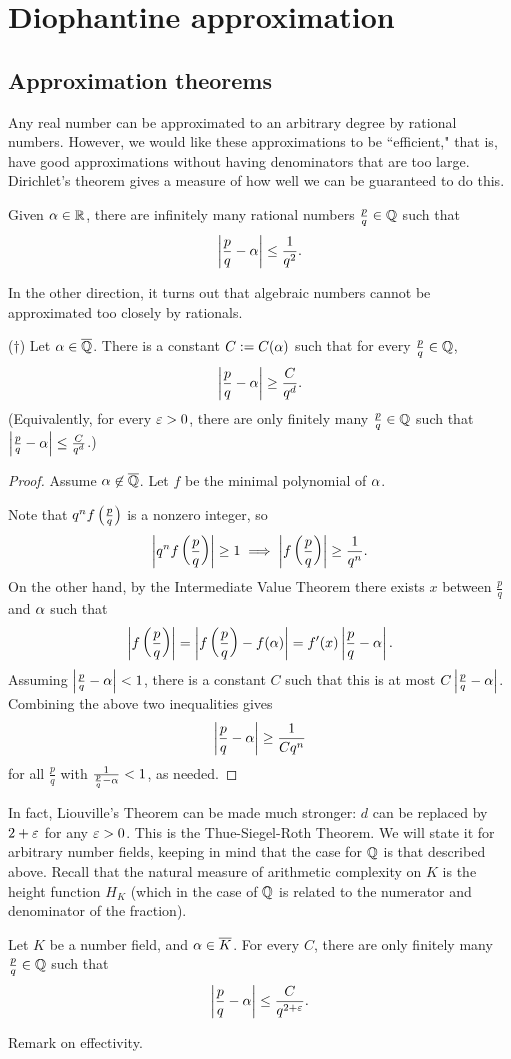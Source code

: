 \chapter{Diophantine approximation}
\section{Approximation theorems}
Any real number can be approximated to an arbitrary degree by rational numbers. However, we would like these approximations to be ``efficient," that is, have good approximations without having denominators that are too large. Dirichlet's theorem gives a measure of how well we can be guaranteed to do this.
\begin{thm}[Dirichlet]
Given $\alpha\in \mathbb{R}$, there are infinitely many rational numbers $\frac pq\in\mathbb{Q}$ such that
\[
\left| {\frac pq-\alpha} \right|\le \frac{1}{q^2}.
\]
\end{thm}
In the other direction, it turns out that algebraic numbers cannot be approximated too closely by rationals.
\begin{thm}[Liouville]($\dagger$)
Let $\alpha\in \overline{\mathbb{Q}}$. There is a constant $C:=C(\alpha)$ such that for every $\frac{p}{q}\in \mathbb{Q}$, 
\[
\left| {\frac pq-\alpha} \right|\ge \frac{C}{q^d}.
\]
(Equivalently, for every $\varepsilon>0$, there are only finitely many $\frac pq \in \mathbb{Q}$ such that $\left| {\frac pq-\alpha} \right|\le \frac{C}{q^d}$.)
\end{thm}
\begin{proof}
Assume $\alpha\not\in \overline{\mathbb{Q}}$. 
Let $f$ be the minimal polynomial of $\alpha$. 

Note that $q^nf\left( {\frac{p}{q}} \right)$ is a nonzero integer, so
\[
\left| {q^nf \left( {\frac{p}{q}} \right)} \right|\ge 1\implies \left| {f\left( {\frac{p}{q}} \right)} \right|\ge \frac{1}{q^n}.
\]
On the other hand, by the Intermediate Value Theorem there exists $x$ between $\frac pq$ and $\alpha$ such that 
\[
\left| {f\left( {\frac{p}{q}} \right)} \right|=\left| {f\left( {\frac{p}{q}} \right)-f(\alpha)} \right|=f'(x) \left| {\frac pq-\alpha} \right|.
\]
Assuming $\left| {\frac pq-\alpha} \right|<1$, there is a constant $C$ such that this is at most $C \left| {\frac pq-\alpha} \right|$. Combining the above two inequalities gives
\[
\left| {\frac pq-\alpha} \right|\ge \frac{1}{Cq^n}
\]
for all $\frac pq$ with $\frac{1}{\frac pq-\alpha}<1$, as needed.
\end{proof}
In fact, Liouville's Theorem can be made much stronger: $d$ can be replaced by $2+\varepsilon$ for any $\varepsilon>0$. This is the Thue-Siegel-Roth Theorem. We will state it for arbitrary number fields, keeping in mind that the case for $\mathbb{Q}$ is that described above. Recall that the natural measure of arithmetic complexity on $K$ is the height function $H_K$ (which in the case of $\mathbb{Q}$ is related to the numerator and denominator of the fraction).
\begin{thm}
Let $K$ be a number field, and $\alpha\in \overline{K}$. 
For every $C$, there are only finitely many $\frac pq\in \mathbb{Q}$ such that
\[
\left| {\frac pq-\alpha} \right|\le \frac{C}{q^{2+\varepsilon}}.
\]
\end{thm}
Remark on effectivity.
